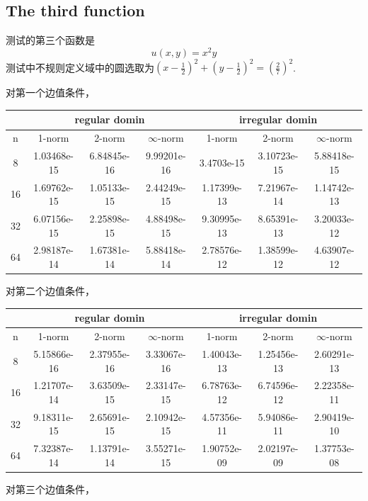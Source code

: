 \documentclass[a4paper,11.5pt,UTF8]{ctexart}
\begin{document}
\begin{large}
\subsection{The third function}
\par 测试的第三个函数是
$$ u(x,y) = x^2y $$
测试中不规则定义域中的圆选取为$(x-\frac{1}{2})^2+(y-\frac{1}{2})^2=(\frac{2}{7})^2$.
\par 对第一个边值条件，
\begin{center}
\begin{tabular}{|c|c|c|c|c|c|c|}
	\hline
	& \multicolumn{3}{c|}{regular domin} & \multicolumn{3}{c|}{irregular domin} \\
	\hline
	n & 1-norm & 2-norm & $\infty$-norm & 1-norm &	2-norm& $\infty$-norm \\
	\hline
	8& 1.03468e-15& 6.84845e-16 &9.99201e-16 & 3.4703e-15 & 3.10723e-15 & 5.88418e-15 \\
	\hline
	16& 1.69762e-15 & 1.05133e-15 & 2.44249e-15 & 1.17399e-13 &7.21967e-14&1.14742e-13\\
	\hline
	32& 6.07156e-15 & 2.25898e-15 & 4.88498e-15 & 9.30995e-13&8.65391e-13&3.20033e-12\\
	\hline
	64& 2.98187e-14 & 1.67381e-14 & 5.88418e-14 & 2.78576e-12 &1.38599e-12&4.63907e-12 \\
	\hline
\end{tabular}
\end{center}
\par 对第二个边值条件，
\begin{center}
\begin{tabular}{|c|c|c|c|c|c|c|}
	\hline
	& \multicolumn{3}{c|}{regular domin} & \multicolumn{3}{c|}{irregular domin} \\
	\hline
	n & 1-norm & 2-norm & $\infty$-norm & 1-norm &	2-norm& $\infty$-norm \\
	\hline
	8& 5.15866e-16& 2.37955e-16 &3.33067e-16 & 1.40043e-13 & 1.25456e-13 & 2.60291e-13 \\
	\hline
	16& 1.21707e-14 & 3.63509e-15 & 2.33147e-15 & 6.78763e-12 &6.74596e-12&2.22358e-11\\
	\hline
	32& 9.18311e-15 & 2.65691e-15 & 2.10942e-15 & 4.57356e-11&5.94086e-11&2.90419e-10\\
	\hline
	64& 7.32387e-14 & 1.13791e-14 & 3.55271e-15 &1.90752e-09&2.02197e-09&1.37753e-08 \\
	\hline
\end{tabular}
\end{center}
\par 对第三个边值条件，

\end{large}
\end{document}
